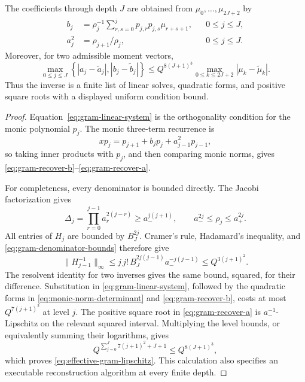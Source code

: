 \begin{proposition}
\label{prop:effective-gram-reconstruction}
The coefficients through depth \(J\) are obtained from
\(\mu_0,\ldots,\mu_{2J+2}\) by
\begin{align}
 b_j&=\rho_j^{-1}
 \sum_{r,s=0}^{j}p_{j,r}p_{j,s}\mu_{r+s+1},
 &&0\le j\le J,
 \label{eq:gram-recover-b}\\
 a_j^2&=\rho_{j+1}/\rho_j,
 &&0\le j\le J.
 \label{eq:gram-recover-a}
\end{align}
Moreover, for two admissible moment vectors,
\begin{equation}
 \max_{0\le j\le J}
 \left\{|a_j-\widetilde a_j|,|b_j-\widetilde b_j|\right\}
 \le Q^{8(J+1)^3}
       \max_{0\le k\le2J+2}|\mu_k-\widetilde\mu_k|.
 \label{eq:effective-gram-lipschitz}
\end{equation}
Thus the inverse is a finite list of linear solves, quadratic forms, and
positive square roots with a displayed uniform condition bound.
\end{proposition}

\begin{proof}
Equation~\eqref{eq:gram-linear-system} is the orthogonality condition for the
monic polynomial \(p_j\).  The monic three-term recurrence is
\[
 xp_j=p_{j+1}+b_jp_j+a_{j-1}^2p_{j-1},
\]
so taking inner products with \(p_j\), and then comparing monic norms, gives
\eqref{eq:gram-recover-b}--\eqref{eq:gram-recover-a}.

For completeness, every denominator is bounded directly.  The Jacobi
factorization gives
\begin{equation}
 \Delta_j=\prod_{r=0}^{j-1}a_r^{2(j-r)}
 \ge a_-^{j(j+1)},
 \qquad
 a_-^{2j}\le\rho_j\le a_+^{2j}.
 \label{eq:gram-denominator-bounds}
\end{equation}
All entries of \(H_j\) are bounded by \(B_J^{2j}\).  Cramer's rule,
Hadamard's inequality, and \eqref{eq:gram-denominator-bounds} therefore give
\[
 \|H_{j-1}^{-1}\|_\infty
 \le j\,j!\,B_J^{2j(j-1)}a_-^{-j(j-1)}
 \le Q^{3(j+1)^2}.
\]
The resolvent identity for two inverses gives the same bound, squared, for
their difference.  Substitution in
\eqref{eq:gram-linear-system}, followed by the quadratic forms in
\eqref{eq:monic-norm-determinant} and
\eqref{eq:gram-recover-b}, costs at most \(Q^{7(j+1)^2}\) at level \(j\).
The positive square root in \eqref{eq:gram-recover-a} is
\(a_-^{-1}\)-Lipschitz on the relevant squared interval.  Multiplying the
level bounds, or equivalently summing their logarithms, gives
\[
 Q^{\sum_{j=0}^{J}7(j+1)^2+J+1}
 \le Q^{8(J+1)^3},
\]
which proves \eqref{eq:effective-gram-lipschitz}.  This calculation also
specifies an executable reconstruction algorithm at every finite depth.
\end{proof}


